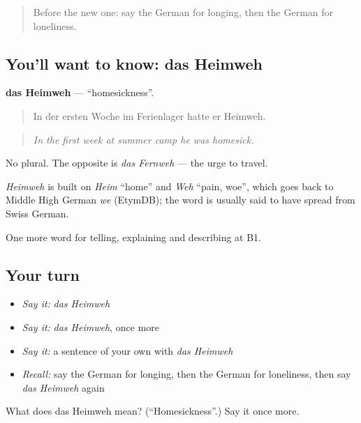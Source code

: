\begin{quote}
Before the new one: say the German for longing, then the German for loneliness.
\end{quote}

\subsection*{You'll want to know: das Heimweh}
\textbf{das Heimweh} — \textquotedblleft{}homesickness\textquotedblright{}.

\begin{quote}
In der ersten Woche im Ferienlager hatte er Heimweh.
\end{quote}

\begin{quote}
\emph{In the first week at summer camp he was homesick.}
\end{quote}

No plural. The opposite is \emph{das Fernweh} — the urge to travel.

\begin{cousinweb}
\emph{Heimweh} is built on \emph{Heim} \textquotedblleft{}home\textquotedblright{} and \emph{Weh} \textquotedblleft{}pain, woe\textquotedblright{}, which goes back to Middle High German \emph{we} (EtymDB); the word is usually said to have spread from Swiss German.
\end{cousinweb}

\begin{grammarlens}[title={What you've built}]
One more word for telling, explaining and describing at B1.
\end{grammarlens}

\subsection*{Your turn}
\begin{itemize}
\raggedright
  \item \emph{Say it:} \emph{das Heimweh}
  \item \emph{Say it:} \emph{das Heimweh}, once more
  \item \emph{Say it:} a sentence of your own with \emph{das Heimweh}
  \item \emph{Recall:} say the German for longing, then the German for loneliness, then say \emph{das Heimweh} again
\end{itemize}

\begin{tcolorbox}[breakable,colback=teal!4,colframe=teal!35!black,title={Before you move on}]
What does das Heimweh mean? (\textquotedblleft{}Homesickness\textquotedblright{}.) Say it once more.
\end{tcolorbox}
